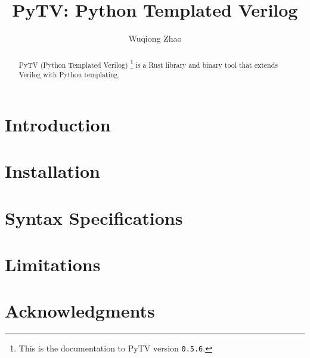 \documentclass{article}
\title{PyTV: Python Templated Verilog}
\author{Wuqiong Zhao}
\newcommand{\pytvversion}{0.5.6}
\begin{document}
\maketitle

\begin{abstract}
  PyTV (Python Templated Verilog)%
  \footnote{This is the documentation to PyTV version \texttt{\pytvversion{}}.}
  is a Rust library and binary tool that extends Verilog with Python templating.
\end{abstract}

\tableofcontents

\section{Introduction}\label{sec:introduction}


\section{Installation}\label{sec:installation}


\section{Syntax Specifications}\label{sec:syntax}


\section{Limitations}\label{sec:limitations}


\section*{Acknowledgments}



{}
\bgroup
\small

\egroup
\end{document}
